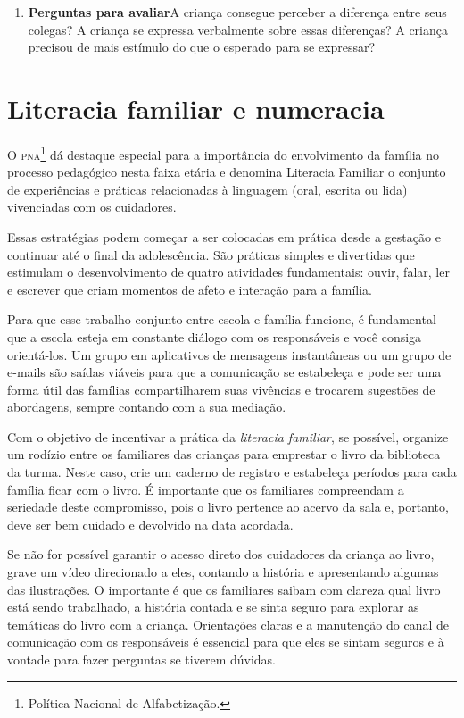 \documentclass[11pt]{extarticle}
\begin{document}
\begin{enumerate}
\item \textbf{Perguntas para avaliar}\quad A criança consegue perceber a diferença entre seus colegas? A criança se expressa verbalmente sobre essas diferenças? A criança precisou de mais estímulo do que o esperado para se expressar?
\end{enumerate}

\section{Literacia familiar e numeracia}
O \textsc{pna}\footnote{Política Nacional de Alfabetização.} dá destaque especial para a importância do envolvimento da família 
no processo pedagógico nesta faixa etária e denomina Literacia Familiar o conjunto 
de experiências e práticas relacionadas à linguagem (oral, escrita ou lida) vivenciadas 
com os cuidadores. 

Essas estratégias podem começar a ser colocadas em prática desde a 
gestação e continuar até o final da adolescência. São práticas simples e divertidas 
que estimulam o desenvolvimento de quatro atividades fundamentais: ouvir, falar, 
ler e escrever que criam momentos de afeto e interação para a família. 

Para que esse trabalho conjunto entre escola e família funcione, é 
fundamental que a escola esteja em constante diálogo com os responsáveis e 
você consiga orientá-los. Um grupo em aplicativos de mensagens instantâneas ou um 
grupo de e-mails são saídas viáveis para que a comunicação se estabeleça e pode ser 
uma forma útil das famílias compartilharem suas vivências e trocarem sugestões 
de abordagens, sempre contando com a sua mediação. 

Com o objetivo de incentivar 
a prática da \textit{literacia familiar}, se possível, organize um rodízio entre os familiares 
das crianças para emprestar o livro da biblioteca da turma. Neste caso, crie um caderno 
de registro e estabeleça períodos para cada família ficar com o livro. É importante 
que os familiares compreendam a seriedade deste compromisso, pois o livro pertence 
ao acervo da sala e, portanto, deve ser bem cuidado e devolvido na data acordada. 

Se não for possível garantir o acesso direto dos cuidadores da criança ao livro, 
grave um vídeo direcionado a eles, contando a história e apresentando algumas 
das ilustrações. O importante é que os familiares saibam com clareza qual livro 
está sendo trabalhado, a história contada e se sinta seguro para explorar as temáticas 
do livro com a criança. Orientações claras e a manutenção do canal de comunicação com 
os responsáveis é essencial para que eles se sintam seguros e à vontade para fazer perguntas 
se tiverem dúvidas. 
\end{document}
